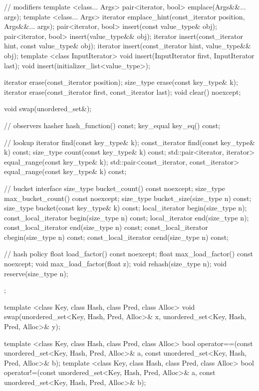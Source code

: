 \begin{codeblock}
{{    // modifiers
    template <class... Args> pair<iterator, bool> emplace(Args&&... args);
    template <class... Args> iterator emplace_hint(const_iterator position, Args&&... args);
    pair<iterator, bool> insert(const value_type& obj);
    pair<iterator, bool> insert(value_type&& obj);
    iterator insert(const_iterator hint, const value_type& obj);
    iterator insert(const_iterator hint, value_type&& obj);
    template <class InputIterator> void insert(InputIterator first, InputIterator last);
    void insert(initializer_list<value_type>);

    iterator erase(const_iterator position);
    size_type erase(const key_type& k);
    iterator erase(const_iterator first, const_iterator last);
    void clear() noexcept;

    void swap(unordered_set&);

    // observers
    hasher hash_function() const;
    key_equal key_eq() const;

    // lookup
    iterator       find(const key_type& k);
    const_iterator find(const key_type& k) const;
    size_type count(const key_type& k) const;
    std::pair<iterator, iterator>             equal_range(const key_type& k);
    std::pair<const_iterator, const_iterator> equal_range(const key_type& k) const;

    // bucket interface
    size_type bucket_count() const noexcept;
    size_type max_bucket_count() const noexcept;
    size_type bucket_size(size_type n) const;
    size_type bucket(const key_type& k) const;
    local_iterator begin(size_type n);
    const_local_iterator begin(size_type n) const;
    local_iterator end(size_type n);
    const_local_iterator end(size_type n) const;
    const_local_iterator cbegin(size_type n) const;
    const_local_iterator cend(size_type n) const;

    // hash policy
    float load_factor() const noexcept;
    float max_load_factor() const noexcept;
    void max_load_factor(float z);
    void rehash(size_type n);
    void reserve(size_type n);
  };

  template <class Key, class Hash, class Pred, class Alloc>
    void swap(unordered_set<Key, Hash, Pred, Alloc>& x,
              unordered_set<Key, Hash, Pred, Alloc>& y);

  template <class Key, class Hash, class Pred, class Alloc>
    bool operator==(const unordered_set<Key, Hash, Pred, Alloc>& a,
                    const unordered_set<Key, Hash, Pred, Alloc>& b);
  template <class Key, class Hash, class Pred, class Alloc>
    bool operator!=(const unordered_set<Key, Hash, Pred, Alloc>& a,
                    const unordered_set<Key, Hash, Pred, Alloc>& b);
}
\end{codeblock}

